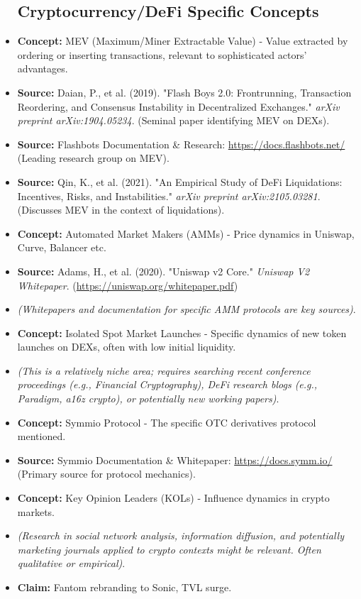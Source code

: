 \documentclass{article}
\begin{document}
\begin{itemize}
    \subsection{Cryptocurrency/DeFi Specific Concepts}
    \item \textbf{Concept:} MEV (Maximum/Miner Extractable Value) - Value extracted by ordering or inserting transactions, relevant to sophisticated actors' advantages.
    \item \textbf{Source:} Daian, P., et al. (2019). "Flash Boys 2.0: Frontrunning, Transaction Reordering, and Consensus Instability in Decentralized Exchanges." \textit{arXiv preprint arXiv:1904.05234}. (Seminal paper identifying MEV on DEXs).
    \item \textbf{Source:} Flashbots Documentation & Research: \url{https://docs.flashbots.net/} (Leading research group on MEV).
    \item \textbf{Source:} Qin, K., et al. (2021). "An Empirical Study of DeFi Liquidations: Incentives, Risks, and Instabilities." \textit{arXiv preprint arXiv:2105.03281}. (Discusses MEV in the context of liquidations).
    \item \textbf{Concept:} Automated Market Makers (AMMs) - Price dynamics in Uniswap, Curve, Balancer etc.
    \item \textbf{Source:} Adams, H., et al. (2020). "Uniswap v2 Core." \textit{Uniswap V2 Whitepaper}. (\url{https://uniswap.org/whitepaper.pdf})
    \item \textit{(Whitepapers and documentation for specific AMM protocols are key sources)}.
    \item \textbf{Concept:} Isolated Spot Market Launches - Specific dynamics of new token launches on DEXs, often with low initial liquidity.
    \item \textit{(This is a relatively niche area; requires searching recent conference proceedings (e.g., Financial Cryptography), DeFi research blogs (e.g., Paradigm, a16z crypto), or potentially new working papers)}.
    \item \textbf{Concept:} Symmio Protocol - The specific OTC derivatives protocol mentioned.
    \item \textbf{Source:} Symmio Documentation & Whitepaper: \url{https://docs.symm.io/} (Primary source for protocol mechanics).
    \item \textbf{Concept:} Key Opinion Leaders (KOLs) - Influence dynamics in crypto markets.
    \item \textit{(Research in social network analysis, information diffusion, and potentially marketing journals applied to crypto contexts might be relevant. Often qualitative or empirical)}. 
    \item \textbf{Claim:} Fantom rebranding to Sonic, TVL surge.


\end{itemize}
\end{document}
